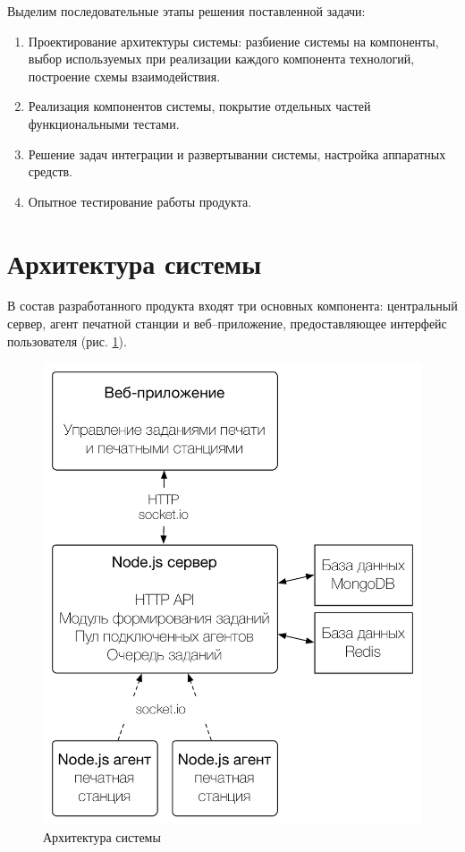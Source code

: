 \documentclass[a4paper,14pt,href]{article}
\begin{document}
Выделим последовательные этапы решения поставленной задачи:
\begin{enumerate}
  \item Проектирование архитектуры системы: разбиение системы на компоненты, выбор используемых при реализации каждого компонента технологий, построение схемы взаимодействия.

  \item Реализация компонентов системы, покрытие отдельных частей функциональными тестами.

  \item Решение задач интеграции и развертывании системы, настройка аппаратных средств.

  \item Опытное тестирование работы продукта.
\end{enumerate}

\newpage
\section{Архитектура системы}
В состав разработанного продукта входят три основных компонента: центральный сервер, агент печатной станции и веб--приложение, предоставляющее интерфейс пользователя (рис. \ref{fig:Architecture}).

\begin{figure}[htbp]
\begin{center}
  \includegraphics[scale=0.7]{architecture.pdf}
    \caption{Архитектура системы}
    \label{fig:Architecture}
\end{center}
\end{figure}
\end{document}
